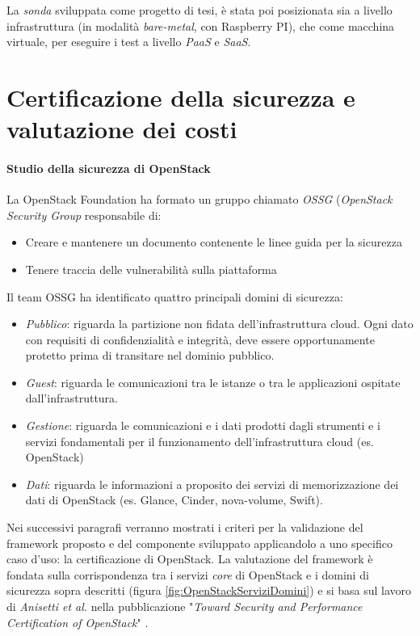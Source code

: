 \documentclass[../main.tex]{subfiles}
\begin{document}
La \textit{sonda} sviluppata come progetto di tesi, è stata poi posizionata sia a livello infrastruttura (in modalità \textit{bare-metal}, con Raspberry PI), che come macchina virtuale, per eseguire i test a livello \textit{PaaS} e \textit{SaaS}.
\section{Certificazione della sicurezza e valutazione dei costi}
\paragraph{Studio della sicurezza di OpenStack}
La OpenStack Foundation ha formato un gruppo chiamato \textit{OSSG} (\textit{OpenStack Security Group} responsabile di:
\begin{itemize}
\item Creare e mantenere un documento contenente le linee guida per la sicurezza \cite{OpenStackSecurity}
\item Tenere traccia delle vulnerabilità sulla piattaforma
\end{itemize}
Il team OSSG ha identificato quattro principali domini di sicurezza:
\begin{itemize}
\item \textit{Pubblico}: riguarda la partizione non fidata dell'infrastruttura cloud. Ogni dato  con requisiti di confidenzialità e integrità, deve essere opportunamente protetto prima di transitare nel dominio pubblico.
\item \textit{Guest}: riguarda le comunicazioni tra le istanze o tra le applicazioni ospitate dall'infrastruttura.
\item \textit{Gestione}: riguarda le comunicazioni e i dati  prodotti dagli strumenti e i servizi fondamentali per il funzionamento dell'infrastruttura cloud (es. OpenStack)
\item \textit{Dati}: riguarda le informazioni a proposito dei servizi di memorizzazione dei dati di OpenStack (es. Glance, Cinder, nova-volume, Swift).
\end{itemize}
Nei successivi paragrafi verranno mostrati i criteri per la validazione del framework proposto e del componente sviluppato applicandolo a uno specifico caso d'uso: la certificazione di OpenStack.
La valutazione del framework è fondata sulla corrispondenza tra i servizi \textit{core} di OpenStack e i domini di sicurezza sopra descritti (figura \ref{fig:OpenStackServiziDomini}) e si basa sul lavoro di \textit{Anisetti et al.} nella pubblicazione "\textit{Toward Security and Performance Certification of OpenStack}" \cite{CertOpenstack}.
\end{document}

